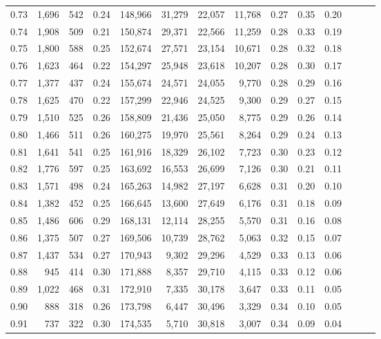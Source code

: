 \begin{tabular}{rrrrrrrrrrrrrr}
0.73 &  1,696 &    542 &  0.24 &  148,966 &   31,279 &  22,057 &  11,768 &  0.27 &  0.35 &      0.20 \\
0.74 &  1,908 &    509 &  0.21 &  150,874 &   29,371 &  22,566 &  11,259 &  0.28 &  0.33 &      0.19 \\
0.75 &  1,800 &    588 &  0.25 &  152,674 &   27,571 &  23,154 &  10,671 &  0.28 &  0.32 &      0.18 \\
0.76 &  1,623 &    464 &  0.22 &  154,297 &   25,948 &  23,618 &  10,207 &  0.28 &  0.30 &      0.17 \\
0.77 &  1,377 &    437 &  0.24 &  155,674 &   24,571 &  24,055 &   9,770 &  0.28 &  0.29 &      0.16 \\
0.78 &  1,625 &    470 &  0.22 &  157,299 &   22,946 &  24,525 &   9,300 &  0.29 &  0.27 &      0.15 \\
0.79 &  1,510 &    525 &  0.26 &  158,809 &   21,436 &  25,050 &   8,775 &  0.29 &  0.26 &      0.14 \\
0.80 &  1,466 &    511 &  0.26 &  160,275 &   19,970 &  25,561 &   8,264 &  0.29 &  0.24 &      0.13 \\
0.81 &  1,641 &    541 &  0.25 &  161,916 &   18,329 &  26,102 &   7,723 &  0.30 &  0.23 &      0.12 \\
0.82 &  1,776 &    597 &  0.25 &  163,692 &   16,553 &  26,699 &   7,126 &  0.30 &  0.21 &      0.11 \\
0.83 &  1,571 &    498 &  0.24 &  165,263 &   14,982 &  27,197 &   6,628 &  0.31 &  0.20 &      0.10 \\
0.84 &  1,382 &    452 &  0.25 &  166,645 &   13,600 &  27,649 &   6,176 &  0.31 &  0.18 &      0.09 \\
0.85 &  1,486 &    606 &  0.29 &  168,131 &   12,114 &  28,255 &   5,570 &  0.31 &  0.16 &      0.08 \\
0.86 &  1,375 &    507 &  0.27 &  169,506 &   10,739 &  28,762 &   5,063 &  0.32 &  0.15 &      0.07 \\
0.87 &  1,437 &    534 &  0.27 &  170,943 &    9,302 &  29,296 &   4,529 &  0.33 &  0.13 &      0.06 \\
0.88 &    945 &    414 &  0.30 &  171,888 &    8,357 &  29,710 &   4,115 &  0.33 &  0.12 &      0.06 \\
0.89 &  1,022 &    468 &  0.31 &  172,910 &    7,335 &  30,178 &   3,647 &  0.33 &  0.11 &      0.05 \\
0.90 &    888 &    318 &  0.26 &  173,798 &    6,447 &  30,496 &   3,329 &  0.34 &  0.10 &      0.05 \\
0.91 &    737 &    322 &  0.30 &  174,535 &    5,710 &  30,818 &   3,007 &  0.34 &  0.09 &      0.04 \\

\end{tabular}
